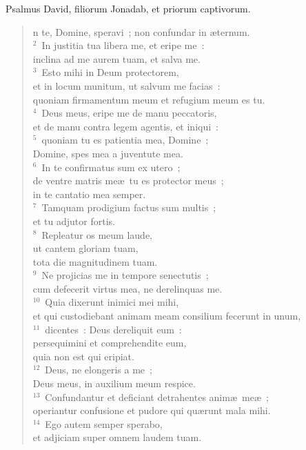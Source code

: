 \bchapter[Psalm]
Psalmus David, filiorum Jonadab, et priorum captivorum. \begin{verse}n te, Domine, speravi~; non confundar in \ae ternum.\\
${}^{2}$~In justitia tua libera me, et eripe me~:\\ inclina ad me aurem tuam, et salva me.\\
${}^{3}$~Esto mihi in Deum protectorem,\\ et in locum munitum, ut salvum me facias~:\\ quoniam firmamentum meum et refugium meum es tu.\\
${}^{4}$~Deus meus, eripe me de manu peccatoris,\\ et de manu contra legem agentis, et iniqui~:\\
${}^{5}$~quoniam tu es patientia mea, Domine~;\\ Domine, spes mea a juventute mea.\\
${}^{6}$~In te confirmatus sum ex utero~;\\ de ventre matris me\ae\ tu es protector meus~;\\ in te cantatio mea semper.\\
${}^{7}$~Tamquam prodigium factus sum multis~;\\ et tu adjutor fortis.\\
${}^{8}$~Repleatur os meum laude,\\ ut cantem gloriam tuam,\\ tota die magnitudinem tuam.\\
${}^{9}$~Ne projicias me in tempore senectutis~;\\ cum defecerit virtus mea, ne derelinquas me.\\
${}^{10}$~Quia dixerunt inimici mei mihi,\\ et qui custodiebant animam meam consilium fecerunt in unum,\\
${}^{11}$~dicentes~: Deus dereliquit eum~:\\ persequimini et comprehendite eum,\\ quia non est qui eripiat.\\
${}^{12}$~Deus, ne elongeris a me~;\\ Deus meus, in auxilium meum respice.\\
${}^{13}$~Confundantur et deficiant detrahentes anim\ae\ me\ae~;\\ operiantur confusione et pudore qui qu\ae runt mala mihi.\\
${}^{14}$~Ego autem semper sperabo,\\ et adjiciam super omnem laudem tuam.\\

\end{verse}
